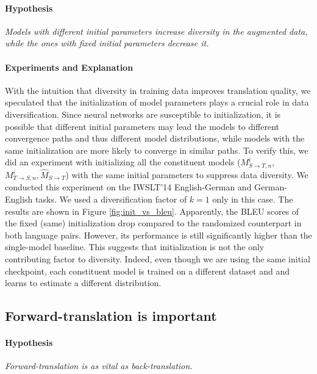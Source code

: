 \documentclass{article}
\begin{document}
\paragraph{Hypothesis} \emph{Models with different initial parameters increase diversity {in the augmented data}, while the ones with fixed initial parameters decrease it.} 

\vspace{-0.5em}
\paragraph{Experiments and Explanation} With the intuition that diversity in training data improves translation quality, we speculated that the initialization of model parameters plays a crucial role in data diversification. Since neural networks are susceptible to initialization, it is possible that different initial parameters may lead the models to different convergence paths \citep{goodfellow2016deep} and thus different model distributions, while models with the same initialization are more likely to converge in similar paths. To verify this, we did an experiment with initializing all the constituent models ($M_{S \rightarrow T,n}^i$, $M_{T \rightarrow S,n}^i,\hat{M}_{S \rightarrow T}$) with the same initial parameters to suppress data  diversity. We conducted this experiment on the IWSLT'14 English-German and German-English tasks. We used a diversification factor of $k=1$ only in this case. The results are shown in Figure \ref{fig:init_vs_bleu}. Apparently, the BLEU scores of the fixed (same) initialization drop compared to the randomized counterpart in both language pairs. However, its performance is still significantly higher than the single-model baseline. This suggests that initialization is not the only contributing factor to diversity. Indeed, even though we are using the same initial checkpoint, each constituent model is trained on a different dataset and and learns to estimate a different distribution.

\subsection{Forward-translation is important} \label{subsec:fwd}

\paragraph{Hypothesis} \emph{Forward-translation is as vital as back-translation.}
\end{document}

